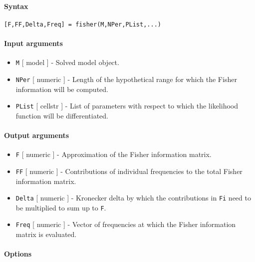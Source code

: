 


	\paragraph{Syntax}

\begin{verbatim}
[F,FF,Delta,Freq] = fisher(M,NPer,PList,...)
\end{verbatim}

\paragraph{Input arguments}

\begin{itemize}
\item
  \texttt{M} {[} model {]} - Solved model object.
\item
  \texttt{NPer} {[} numeric {]} - Length of the hypothetical range for
  which the Fisher information will be computed.
\item
  \texttt{PList} {[} cellstr {]} - List of parameters with respect to
  which the likelihood function will be differentiated.
\end{itemize}

\paragraph{Output arguments}

\begin{itemize}
\item
  \texttt{F} {[} numeric {]} - Approximation of the Fisher information
  matrix.
\item
  \texttt{FF} {[} numeric {]} - Contributions of individual frequencies
  to the total Fisher information matrix.
\item
  \texttt{Delta} {[} numeric {]} - Kronecker delta by which the
  contributions in \texttt{Fi} need to be multiplied to sum up to
  \texttt{F}.
\item
  \texttt{Freq} {[} numeric {]} - Vector of frequencies at which the
  Fisher information matrix is evaluated.
\end{itemize}

\paragraph{Options}

